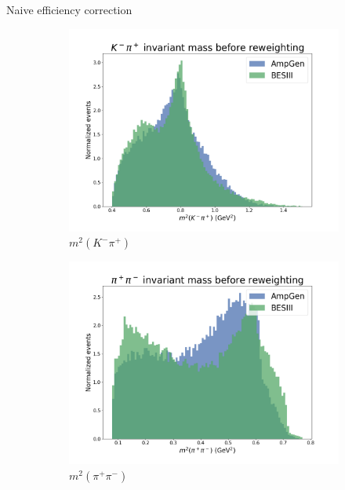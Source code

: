 \documentclass{beamer}
\begin{document}
\begin{frame}{Naive efficiency correction}
\begin{figure}
\begin{subfigure}{0.33\textwidth}
      \includegraphics[width = 1.0\textwidth]{Plots/s12_BeforeReweighting.png}
      \caption{$m^2(K^-\pi^+)$}
    \end{subfigure}
    \begin{subfigure}{0.33\textwidth}
      \includegraphics[width = 1.0\textwidth]{Plots/s23_BeforeReweighting.png}
      \caption{$m^2(\pi^+\pi^-)$}
    \end{subfigure}%
    \begin{subfigure}{0.33\textwidth}

\end{subfigure}
\end{figure}
\end{frame}
\end{document}
